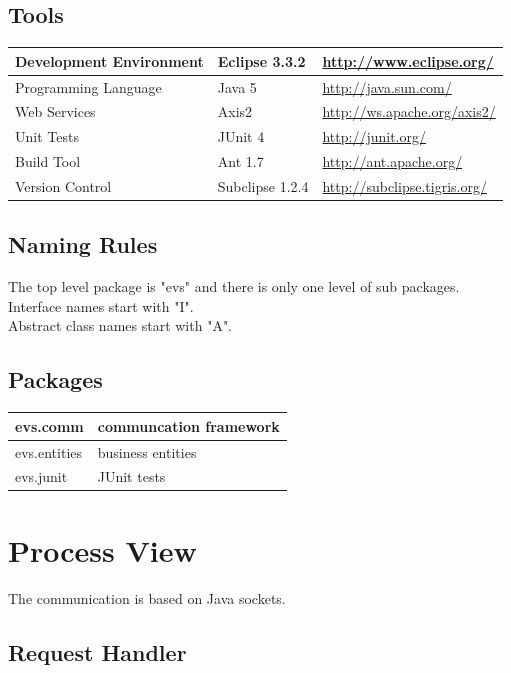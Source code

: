 \documentclass[a4paper]{article}
\begin{document}
\subsection{Tools}

	\begin{tabular}{|l|l|l|}
	\hline
	Development Environment & Eclipse 3.3.2 & \url{http://www.eclipse.org/}\\
	\hline
	Programming Language & Java 5 & \url{http://java.sun.com/}\\
	\hline
	Web Services & Axis2 & \url{http://ws.apache.org/axis2/}\\
	\hline
	Unit Tests & JUnit 4 & \url{http://junit.org/}\\
	\hline
	Build Tool & Ant 1.7 & \url{http://ant.apache.org/}\\
	\hline
	Version Control & Subclipse 1.2.4 & \url{http://subclipse.tigris.org/}\\
	\hline
	\end{tabular}

\subsection{Naming Rules}

The top level package is "evs" and there is only one level of sub packages.\\
Interface names start with "I".\\
Abstract class names start with "A".\\

\subsection{Packages}

	\begin{tabular}{|l|l|}
	\hline
	evs.comm & communcation framework\\
	\hline
	evs.entities & business entities\\
	\hline
	evs.junit & JUnit tests\\
	\hline
	\end{tabular}

\section{Process View}

The communication is based on Java sockets.

\subsection{Request Handler}
\end{document}

